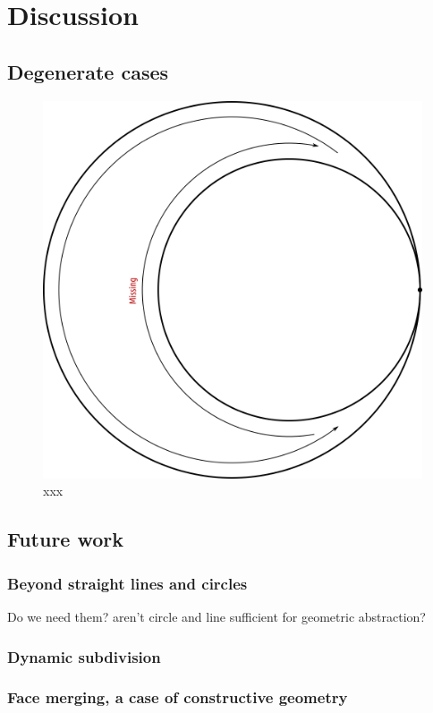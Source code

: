 \section{Discussion} \label{sec:discussion}

\subsection{Degenerate cases}

\begin{figure} %
    \centering
    \includegraphics[width=.5\textwidth]{figures/disc_specialCase1.png}
    \caption{xxx}
    \label{fig:disc_specialCase1}
\end{figure}


\subsection{Future work}


\subsubsection{Beyond straight lines and circles}

Do we need them? aren't circle and line sufficient for geometric abstraction?

\subsubsection{Dynamic subdivision}


\subsubsection{Face merging, a case of constructive geometry}
